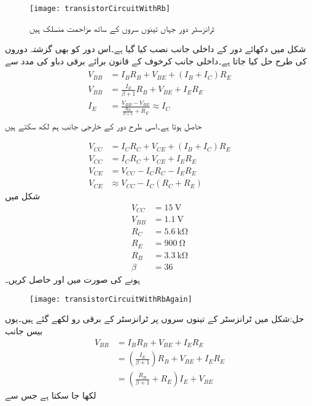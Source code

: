 \begin{figure}
\centering
\texttt{[image: transistorCircuitWithRb]}
\caption{ٹرانزسٹر دور جہاں تینوں سروں کے ساتھ مزاحمت منسلک ہیں}
\label{شکل_تینوں_سروں_پر_مزاحمت}
\end{figure}

شکل  میں دکھائے دور کے داخلی جانب  نصب کیا گیا ہے۔اس دور کو بھی گزشتہ دوروں کی طرح حل کیا جاتا ہے۔داخلی جانب کرخوف کے قانون برائے برقی دباو کی مدد سے 
\begin{gather} \label{مساوات_ٹرانزسٹر_دور_بمع_تینوں_مزاحمت_کی_داخلی_جانب}
\begin{aligned}
V_{BB}&=I_B R_B+V_{BE}+( I_B+I_C )R_E \\
V_{BB}& =\frac{I_E}{\beta+1} R_B +V_{BE}+I_E R_E\\
I_E&=\frac{V_{BB}-V_{BE}}{\frac{R_B}{\beta+1}+R_E} \approx I_C
\end{aligned}
\end{gather}
حاصل ہوتا ہے۔اسی طرح دور کے خارجی جانب ہم لکھ سکتے ہیں

\begin{align} \label{مساوات_ٹرانزسٹر_دور_بمع_تینوں_مزاحمت_کی_خارجی_جانب}
V_{CC}&=I_C R_C +V_{CE}+(I_B+I_C)R_E\\
V_{CC}&=I_C R_C + V_{CE}+I_E R_E\\
V_{CE}&=V_{CC}-I_C R_C-I_E R_E\\
V_{CE} & \approx V_{CC} -I_C(R_C+R_E)
\end{align}
شکل   میں
\begin{align*}
V_{CC}&=\SI{15}{\volt}\\
V_{BB}&=\SI{1.1}{\volt} \\
R_C&=\SI{5.6}{\kilo \ohm} \\
R_E&=\SI{900}{\ohm}\\
R_B &=\SI{3.3}{\kilo \ohm}\\
\beta &=36
\end{align*}
ہونے کی صورت میں  اور  حاصل کریں۔
\begin{figure}
\centering
\texttt{[image: transistorCircuitWithRbAgain]}
\caption{}
\label{شکل_تینوں_سروں_پر_مزاحمت_الف}
\end{figure}

حل:شکل میں ٹرانزسٹر کے تینوں سروں پر ٹرانزسٹر کے برقی رو لکھے گئے ہیں۔یوں بیس جانب 
\begin{align*}
V_{BB}&=I_B R_B +V_{BE}+I_E R_E\\
&=\left(\frac{I_E}{\beta+1}\right) R_B +V_{BE}+I_E R_E\\
&=\left(\frac{R_B}{\beta+1} +R_E \right) I_E +V_{BE}
\end{align*}
لکھا جا سکتا ہے جس سے

